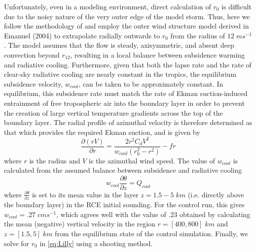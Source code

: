 \documentclass[12pt]{article}
\begin{document}
Unfortunately, even in a modeling environment, direct calculation of $r_0$ is difficult due to the noisy nature of the very outer edge of the model storm. Thus, here we follow the methodology of \cite{Chavas_Emanuel_2010} and employ the outer wind structure model derived in Emanuel (2004) to extrapolate radially outwards to $r_0$ from the radius of $12 \; ms^{-1}$. The model assumes that the flow is steady, axisymmetric, and absent deep convection beyond $r_{12}$, resulting in a local balance between subsidence warming and radiative cooling. Furthermore, given that both the lapse rate and the rate of clear-sky radiative cooling are nearly constant in the tropics, the equilibrium subsidence velocity, $w_{cool}$, can be taken to be approximately constant. In equilibrium, this subsidence rate must match the rate of Ekman suction-induced entrainment of free tropospheric air into the boundary layer in order to prevent the creation of large vertical temperature gradients across the top of the boundary layer. The radial profile of azimuthal velocity is therefore determined as that which provides the required Ekman suction, and is given by
\begin{equation}
    \label{eq:Lilly}
    \frac{\partial (rV)}{\partial r}=\frac{2r^2C_dV^2}{w_{cool}(r_0^2-r^2)}-fr
\end{equation}
where $r$ is the radius and $V$ is the azimuthal wind speed. The value of $w_{cool}$ is calculated from the assumed balance between subsidence and radiative cooling
\begin{equation}
    \label{eq:radsub}
    w_{cool} \frac{\partial \theta}{\partial z}=Q_{cool}
\end{equation}
where $\frac{\partial \theta}{\partial z}$ is set to its mean value in the layer $z=1.5-5 \; km$ (i.e. directly above the boundary layer) in the RCE initial sounding. For the control run, this gives $w_{cool} = .27 \; cm s^{-1}$, which agrees well with the value of $.23$ obtained by calculating the mean (negative) vertical velocity in the region $r = [400, 800] \; km$ and $z = [1.5, 5] \; km$ from the equilibrium state of the control simulation.  Finally, we solve for $r_0$ in \eqref{eq:Lilly} using a shooting method.
\end{document}
